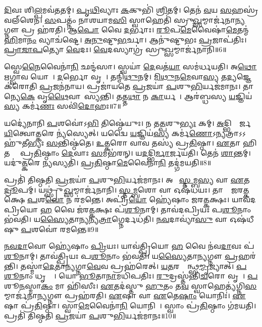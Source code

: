 \ul{𑌦𑌿}𑌵𑌃 𑌶𑌿\ul{𑌲𑍍𑌪}𑌮𑌵॑𑌤𑌤𑌮𑍍।
\ul{𑌪𑍃}\ul{𑌥𑌿}𑌵𑍍𑌯𑌾𑌃 \ul{𑌕}𑌕𑍁𑌭𑌿॑ \ul{𑌶𑍍𑌰𑌿}𑌤𑌮𑍍।
𑌤𑍇𑌨॑ \ul{𑌵}𑌯 \ul{𑌸}𑌹𑌸𑍍𑌰॑𑌵𑌲𑍍‌𑌶𑍇𑌨।
\ul{𑌸}𑌪𑌤𑍍𑌨𑌂॑ 𑌨𑌾𑌶𑌯𑌾𑌮\ul{𑌸𑌿} 𑌸𑍍𑌵𑌾𑌹𑍇𑌤𑌿॑ 𑌸𑍍𑌰𑍁\ul{𑌖𑍍𑌸}𑌮𑍍𑌮𑌾𑌰𑍍𑌜॑𑌨𑌾\ul{𑌨𑍍𑌯}𑌗𑍍𑌨𑍗 𑌪𑍍𑌰 𑌹॑𑌰𑌤𑌿।
𑌆\ul{𑌪𑍋} 𑌵𑍈 \ul{𑌦}𑌰𑍍𑌭𑌾𑌃।
\ul{𑌰𑍂}𑌪\ul{𑌮𑍇}𑌵𑍈𑌷𑌾॑\ul{𑌮𑍇}𑌤𑌨𑍍𑌮॑\ul{𑌹𑌿}𑌮𑌾\ul{𑌨𑌂} 𑌵𑍍𑌯𑌾𑌚॑𑌷𑍍𑌟𑍇।
\ul{𑌅}\ul{𑌨𑍁}𑌷𑍍𑌟𑍁\ul{𑌭}𑌰𑍍𑌚𑌾।
𑌆𑌨𑍁॑𑌷𑍍𑌟𑍁𑌭𑌃 \ul{𑌪𑍍𑌰}𑌜𑌾𑌪॑𑌤𑌿𑌃।
\ul{𑌪𑍍𑌰𑌾}\ul{𑌜𑌾}\ul{𑌪}𑌤𑍍𑌯𑍋 \ul{𑌵𑍇}𑌦𑌃।
\ul{𑌵𑍇}𑌦𑌸𑍍𑌯𑌾𑌗𑍍𑌰॑ 𑌸𑍍𑌰𑍁\ul{𑌖𑍍𑌸}𑌮𑍍𑌮𑌾𑌰𑍍𑌜॑𑌨𑌾𑌨𑌿॥6॥

𑌸𑍍𑌵𑍇\ul{𑌨𑍈}𑌵𑍈𑌨𑌾॑\ul{𑌨𑌿} 𑌛𑌨𑍍𑌦॑𑌸𑌾।
𑌸𑍍𑌵𑌯𑌾॑ \ul{𑌦𑍇}𑌵𑌤॑\ul{𑌯𑌾} 𑌸𑌮॑𑌰𑍍𑌧𑌯𑌤𑌿।
𑌅\ul{𑌥𑍋} 𑌋𑌗𑍍𑌵𑌾𑌵 𑌯𑍋𑌷𑌾᳚।
\ul{𑌦}𑌰𑍍𑌭𑍋 𑌵𑍃𑌷𑌾᳚।
𑌤𑌨𑍍𑌮𑌿॑\ul{𑌥𑍁}𑌨𑌮𑍍।
\ul{𑌮𑌿}\ul{𑌥𑍁}𑌨\ul{𑌮𑍇}𑌵𑌾\ul{𑌸𑍍𑌯} 𑌤\ul{𑌦𑍍𑌯}𑌜𑍍𑌞𑍇 𑌕॑𑌰𑍋𑌤𑌿 \ul{𑌪𑍍𑌰}𑌜𑌨॑𑌨𑌾𑌯।
𑌪𑍍𑌰𑌜𑌾॑𑌯𑌤𑍇 \ul{𑌪𑍍𑌰}𑌜𑌯𑌾॑ \ul{𑌪}𑌶𑍁\ul{𑌭𑌿}𑌰𑍍𑌯𑌜॑𑌮𑌾𑌨𑌃।
𑌤𑌾𑌨𑍍𑌯𑍇\ul{𑌕𑍇} 𑌵𑍃\ul{𑌥𑍈}𑌵𑌾𑌪𑌾᳚𑌸𑍍𑌯𑌨𑍍𑌤𑌿।
𑌤𑌤𑍍𑌤\ul{𑌥𑌾} 𑌨 \ul{𑌕𑌾}𑌰𑍍𑌯𑌮𑍍᳚।
𑌆𑌰॑𑌬𑍍𑌧𑌸𑍍𑌯 \ul{𑌯}𑌜𑍍𑌞𑌿𑌯॑\ul{𑌸𑍍𑌯} 𑌕𑌰𑍍𑌮॑\ul{𑌣𑌃} 𑌸𑌵𑌿॑\ul{𑌦𑍋}𑌹𑌃॥7॥

𑌯𑌦𑍍𑌯𑍇॑𑌨𑌾𑌨𑌿 \ul{𑌪}𑌶𑌵𑍋॑𑌽\ul{𑌭𑌿} 𑌤𑌿𑌷𑍍𑌠𑍇॑𑌯𑍁𑌃।
𑌨 𑌤\ul{𑌤𑍍𑌪}𑌶𑍁\ul{𑌭𑍍𑌯𑌃} 𑌕𑌮𑍍।
\ul{𑌅}𑌦𑍍𑌭𑌿𑌰𑍍𑌮𑌾᳚𑌰𑍍𑌜\ul{𑌯𑌿}𑌤𑍍𑌵𑍋\ul{𑌤𑍍𑌕}𑌰𑍇 𑌨𑍍𑌯॑𑌸𑍍𑌯𑍇𑌤𑍍।
𑌯𑌦𑍍𑌵𑍈 \ul{𑌯}𑌜𑍍𑌞𑌿𑌯॑\ul{𑌸𑍍𑌯} 𑌕𑌰𑍍𑌮॑\ul{𑌣𑍋}\-𑌽𑌨𑍍𑌯𑌤𑍍𑌰𑌾𑌽𑌽𑌹𑍁॑𑌤𑍀𑌭𑍍𑌯𑌃 \ul{𑌸}𑌨𑍍𑌤𑌿𑌷𑍍𑌠॑𑌤𑍇।
\ul{𑌉}\ul{𑌤𑍍𑌕}𑌰𑍋 𑌵𑌾𑌵 𑌤𑌸𑍍𑌯॑ 𑌪𑍍𑌰\ul{𑌤𑌿}𑌷𑍍𑌠𑌾।
\ul{𑌏}𑌤𑌾 𑌹𑌿 𑌤𑌸𑍍𑌮𑍈᳚ 𑌪𑍍𑌰\ul{𑌤𑌿}𑌷𑍍𑌠𑌾𑌂 \ul{𑌦𑍇}𑌵𑌾𑌃 \ul{𑌸}𑌮𑌭॑𑌰𑌨𑍍।
𑌯\ul{𑌦}𑌦𑍍𑌭𑌿\ul{𑌰𑍍𑌮𑌾}𑌰𑍍𑌜𑌯॑𑌤𑌿।
𑌤𑍇𑌨॑ \ul{𑌶𑌾}𑌨𑍍𑌤𑌮𑍍।
𑌯𑌦𑍁॑\ul{𑌤𑍍𑌕}𑌰𑍇 \ul{𑌨𑍍𑌯}𑌸𑍍𑌯𑌤𑌿॑।
\ul{𑌪𑍍𑌰}\ul{𑌤𑌿}𑌷𑍍𑌠𑌾\ul{𑌮𑍇}𑌵𑍈𑌨𑌾॑\ul{𑌨𑌿} 𑌤𑌦𑍍𑌗॑𑌮𑌯𑌤𑌿॥8॥

𑌪𑍍𑌰𑌤𑌿॑ 𑌤𑌿𑌷𑍍𑌠𑌤𑌿 \ul{𑌪𑍍𑌰}𑌜𑌯𑌾॑ \ul{𑌪}𑌶𑍁\ul{𑌭𑌿}𑌰𑍍𑌯𑌜॑𑌮𑌾𑌨𑌃।
𑌅𑌥𑍋᳚ \ul{𑌸𑍍𑌤}𑌮𑍍𑌬\ul{𑌸𑍍𑌯} 𑌵𑌾 \ul{𑌏}𑌤\ul{𑌦𑍍𑌰𑍂}𑌪𑌮𑍍।
𑌯𑌥𑍍𑌸𑍍𑌰𑍁॑\ul{𑌖𑍍𑌸}𑌮𑍍𑌮𑌾𑌰𑍍𑌜॑𑌨𑌾𑌨𑌿।
\ul{𑌸𑍍𑌤}\ul{𑌮𑍍𑌬}𑌶𑍋 𑌵𑌾 𑌓𑌷॑𑌧𑌯𑌃।
𑌤𑌾𑌸𑌾𑌂᳚ 𑌜𑌰\ul{𑌤𑍍𑌕}𑌕𑍍𑌷𑍇 \ul{𑌪}𑌶\ul{𑌵𑍋} 𑌨 𑌰॑𑌮𑌨𑍍𑌤𑍇।
𑌅𑌪𑍍𑌰𑌿॑\ul{𑌯𑍋} 𑌹𑍍𑌯𑍇॑𑌷𑌾𑌂 𑌜𑌰\ul{𑌤𑍍𑌕}𑌕𑍍𑌷𑌃।
𑌯𑌾𑌵॑𑌦𑌪𑍍𑌰𑌿𑌯𑍋 \ul{𑌹} 𑌵𑍈 𑌜॑𑌰\ul{𑌤𑍍𑌕}𑌕𑍍𑌷𑌃 𑌪॑\ul{𑌶𑍂}𑌨𑌾𑌮𑍍।
𑌤𑌾𑌵॑𑌦𑌪𑍍𑌰𑌿𑌯𑌃 𑌪\ul{𑌶𑍂}𑌨𑌾𑌂 𑌭॑𑌵𑌤𑌿।
𑌯\ul{𑌸𑍍𑌯𑍈}𑌤𑌾\ul{𑌨𑍍𑌯}𑌨𑍍𑌯\ul{𑌤𑍍𑌰𑌾}𑌗𑍍𑌨𑍇𑌰𑍍𑌦𑌧॑𑌤𑌿।
\ul{𑌨}\ul{𑌵}𑌦𑌾𑌵𑍍𑌯𑌾॑\ul{𑌸𑍁} 𑌵𑌾 𑌓𑌷॑𑌧𑍀𑌷𑍁 \ul{𑌪}𑌶𑌵𑍋॑ 𑌰𑌮𑌨𑍍𑌤𑍇॥9॥

\ul{𑌨}\ul{𑌵}\ul{𑌦𑌾}𑌵𑍋 𑌹𑍍𑌯𑍇॑𑌷𑌾𑌂 \ul{𑌪𑍍𑌰𑌿}𑌯𑌃।
𑌯𑌾𑌵॑𑌤𑍍𑌪𑍍𑌰𑌿𑌯𑍋 \ul{𑌹} 𑌵𑍈 𑌨॑𑌵\ul{𑌦𑌾}𑌵𑌃 𑌪॑\ul{𑌶𑍂}𑌨𑌾𑌮𑍍।
𑌤𑌾𑌵॑𑌤𑍍𑌪𑍍𑌰𑌿𑌯𑌃 𑌪\ul{𑌶𑍂}𑌨𑌾𑌂 𑌭॑𑌵𑌤𑌿।
𑌯\ul{𑌸𑍍𑌯𑍈}𑌤𑌾\ul{𑌨𑍍𑌯}𑌗𑍍𑌨𑍗 \ul{𑌪𑍍𑌰}𑌹𑌰॑𑌨𑍍𑌤𑌿।
𑌤𑌸𑍍𑌮𑌾॑\ul{𑌦𑍇}𑌤𑌾\ul{𑌨𑍍𑌯}𑌗𑍍𑌨𑌾\ul{𑌵𑍇}𑌵 𑌪𑍍𑌰𑌹॑𑌰𑍇𑌤𑍍।
\ul{𑌯}\ul{𑌤}𑌰𑌸𑍍𑌮𑌿᳚𑌨𑍍𑌥𑍍𑌸\ul{𑌮𑍍𑌮𑍃}𑌜𑍍𑌯𑌾𑌤𑍍।
\ul{𑌪}\ul{𑌶𑍂}𑌨𑌾𑌂 𑌧𑍃𑌤𑍍𑌯𑍈᳚।
𑌯𑍋 \ul{𑌭𑍂}𑌤𑌾\ul{𑌨𑌾}𑌮𑌧𑌿॑𑌪𑌤𑌿𑌃।
\ul{𑌰𑍁}𑌦𑍍𑌰𑌸𑍍𑌤॑𑌨𑍍𑌤𑌿\ul{𑌚}𑌰𑍋 𑌵𑍃𑌷𑌾᳚।
\ul{𑌪}𑌶𑍂\ul{𑌨}𑌸𑍍𑌮𑌾\ul{𑌕𑌂} 𑌮𑌾 𑌹𑌿॑𑌸𑍀𑌃।
\ul{𑌏}𑌤𑌦॑𑌸𑍍𑌤𑍁 \ul{𑌹𑍁}𑌤𑌂 𑌤\ul{𑌵} 𑌸𑍍𑌵𑌾𑌹𑍇𑌤𑍍𑌯॑𑌗𑍍𑌨𑌿\ul{𑌸}𑌮𑍍𑌮𑌾𑌰𑍍𑌜॑𑌨𑌾\ul{𑌨𑍍𑌯}𑌗𑍍𑌨𑍗 𑌪𑍍𑌰𑌹॑𑌰𑌤𑌿।
\ul{𑌏}𑌷𑌾 𑌵𑌾 \ul{𑌏}𑌤𑍇\ul{𑌷𑌾𑌂} 𑌯𑍋𑌨𑌿𑌃॑।
\ul{𑌏}𑌷𑌾 𑌪𑍍𑌰॑\ul{𑌤𑌿}𑌷𑍍𑌠𑌾।
𑌸𑍍𑌵𑌾\ul{𑌮𑍇}𑌵𑍈𑌨𑌾॑\ul{𑌨𑌿} 𑌯𑍋𑌨𑌿𑌮𑍍᳚।
𑌸𑍍𑌵𑌾𑌂 𑌪𑍍𑌰॑\ul{𑌤𑌿}𑌷𑍍𑌠𑌾𑌂 𑌗॑𑌮𑌯𑌤𑌿।
𑌪𑍍𑌰𑌤𑌿॑ 𑌤𑌿𑌷𑍍𑌠𑌤𑌿 \ul{𑌪𑍍𑌰}𑌜𑌯𑌾॑ \ul{𑌪}𑌶𑍁\ul{𑌭𑌿}𑌰𑍍𑌯𑌜॑𑌮𑌾𑌨𑌃॥10॥

